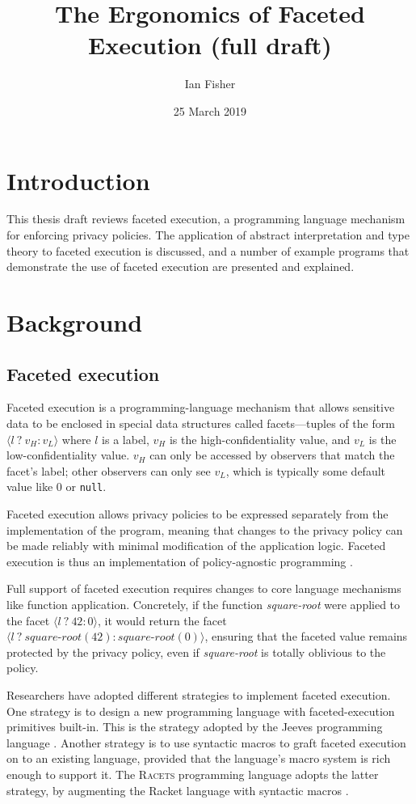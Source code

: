 \documentclass{article}
\title{The Ergonomics of Faceted Execution (full draft)}
\author{Ian Fisher}
\date{25 March 2019}
\begin{document}
\maketitle

\section{Introduction}
This thesis draft reviews faceted execution, a programming language mechanism for enforcing privacy policies. The application of abstract interpretation and type theory to faceted execution is discussed, and a number of example programs that demonstrate the use of faceted execution are presented and explained.

\section{Background}
\subsection{Faceted execution\label{sec:facets}}
Faceted execution is a programming-language mechanism that allows sensitive data to be enclosed in special data structures called facets---tuples of the form $\langle l\ ?\ v_H : v_L \rangle$ where $l$ is a label, $v_H$ is the high-confidentiality value, and $v_L$ is the low-confidentiality value. $v_H$ can only be accessed by observers that match the facet's label; other observers can only see $v_L$, which is typically some default value like $0$ or \texttt{null}.

Faceted execution allows privacy policies to be expressed separately from the implementation of the program, meaning that changes to the privacy policy can be made reliably with minimal modification of the application logic. Faceted execution is thus an implementation of policy-agnostic programming \cite{faceted}.

Full support of faceted execution requires changes to core language mechanisms like function application. Concretely, if the function \textit{square-root} were applied to the facet $\langle l \ ?\ 42 : 0 \rangle$, it would return the facet $\langle l \ ?\ \textit{square-root}(42) : \textit{square-root}(0) \rangle$, ensuring that the faceted value remains protected by the privacy policy, even if \textit{square-root} is totally oblivious to the policy.

Researchers have adopted different strategies to implement faceted execution. One strategy is to design a new programming language with faceted-execution primitives built-in. This is the strategy adopted by the Jeeves programming language \cite{jeeves}. Another strategy is to use syntactic macros to graft faceted execution on to an existing language, provided that the language's macro system is rich enough to support it. The \textsc{Racets} programming language adopts the latter strategy, by augmenting the Racket language with syntactic macros \cite{racets}.
\end{document}
